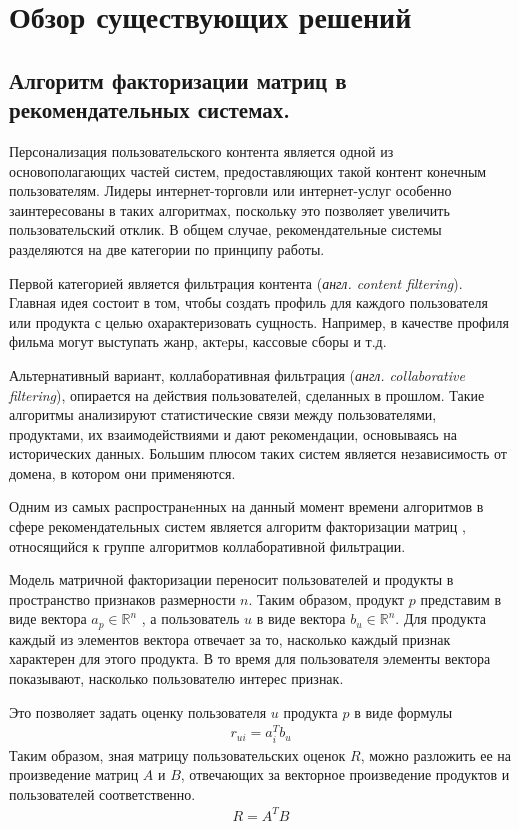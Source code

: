 \documentclass[times,specification,annotation]{itmo-student-thesis}
\begin{document}
\section{Обзор существующих решений}

\subsection{Алгоритм факторизации матриц в рекомендательных системах.}\label{sec:als}

Персонализация пользовательского контента является одной из основополагающих частей систем, предоставляющих такой контент конечным пользователям. Лидеры интернет-торговли или интернет-услуг особенно заинтересованы в таких алгоритмах, поскольку это позволяет увеличить пользовательский отклик.
В общем случае, рекомендательные системы разделяются на две категории по принципу работы.
  
Первой категорией является фильтрация контента (\textit{англ. content filtering})\cite{Lops2011}. Главная идея состоит в том, чтобы создать профиль для каждого пользователя или продукта с целью охарактеризовать сущность. Например, в качестве профиля фильма могут выступать жанр, актeры, кассовые сборы и т.д.

Альтернативный вариант, коллаборативная фильтрация (\textit{англ. collaborative filtering}), опирается на действия пользователей, сделанных в прошлом. Такие алгоритмы анализируют статистические связи между пользователями, продуктами, их взаимодействиями и дают рекомендации, основываясь на исторических данных.  Большим плюсом таких систем является независимость от домена, в котором они применяются.

Одним из самых распространeнных на данный момент времени алгоритмов в сфере рекомендательных систем является алгоритм факторизации матриц \cite{koren2009}, относящийся к группе алгоритмов коллаборативной фильтрации.

Модель матричной факторизации переносит пользователей и продукты в пространство признаков размерности $n$. Таким образом, продукт $p$ представим в виде вектора $a_{p} \in \mathbb{R}^n$ , а пользователь $u$ в виде вектора $b_{u} \in \mathbb{R}^n$. Для продукта каждый из элементов вектора отвечает за то, насколько каждый признак характерен для  этого продукта. В то время для пользователя элементы вектора показывают, насколько пользователю интерес признак.

Это позволяет задать оценку пользователя $u$ продукта $p$ в виде формулы
 \begin{align*}
r_{ui} = a_{i}^{T}b_{u}
\end{align*}
Таким образом, зная матрицу пользовательских оценок $R$, можно разложить ее на произведение матриц $A$ и $B$, отвечающих за векторное произведение продуктов и пользователей соответственно.
 \begin{align*}
R = A^TB
\end{align*}
\end{document}
